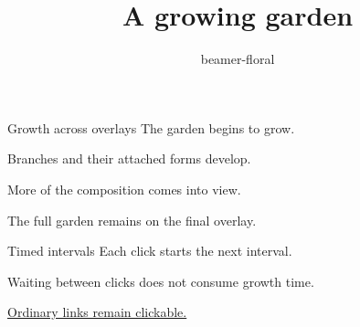 \documentclass[aspectratio=169]{beamer}
\title{A growing garden}\author{beamer-floral}\date{}
\begin{document}
\begin{frame}[plain]\titlepage\end{frame}
\begin{frame}{Growth across overlays}
  The garden begins to grow.\pause\par
  Branches and their attached forms develop.\pause\par
  More of the composition comes into view.\pause\par
  The full garden remains on the final overlay.
\end{frame}
\begin{frame}{Timed intervals}
  Each click starts the next interval.\pause\par
  Waiting between clicks does not consume growth time.\par
  \href{https://github.com/krissen/beamer-floral}{Ordinary links remain clickable.}
\end{frame}
\end{document}
